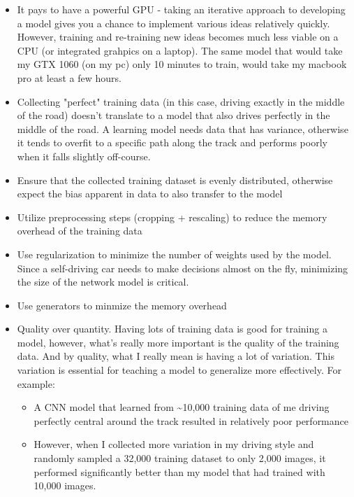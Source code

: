 \documentclass[11pt]{article}
\providecommand{\tightlist}{%
      \setlength{\itemsep}{0pt}\setlength{\parskip}{0pt}}
\begin{document}
\begin{itemize}
\tightlist
\item
  It pays to have a powerful GPU - taking an iterative approach to
  developing a model gives you a chance to implement various ideas
  relatively quickly. However, training and re-training new ideas
  becomes much less viable on a CPU (or integrated grahpics on a
  laptop). The same model that would take my GTX 1060 (on my pc) only 10
  minutes to train, would take my macbook pro at least a few hours.
\item
  Collecting "perfect" training data (in this case, driving exactly in
  the middle of the road) doesn't translate to a model that also drives
  perfectly in the middle of the road. A learning model needs data that
  has variance, otherwise it tends to overfit to a specific path along
  the track and performs poorly when it falls slightly off-course.
\item
  Ensure that the collected training dataset is evenly distributed,
  otherwise expect the bias apparent in data to also transfer to the
  model
\item
  Utilize preprocessing steps (cropping + rescaling) to reduce the
  memory overhead of the training data
\item
  Use regularization to minimize the number of weights used by the
  model. Since a self-driving car needs to make decisions almost on the
  fly, minimizing the size of the network model is critical.
\item
  Use generators to minmize the memory overhead
\item
  Quality over quantity. Having lots of training data is good for
  training a model, however, what's really more important is the quality
  of the training data. And by quality, what I really mean is having a
  lot of variation. This variation is essential for teaching a model to
  generalize more effectively. For example:

  \begin{itemize}
  \tightlist
  \item
    A CNN model that learned from \textasciitilde{}10,000 training data
    of me driving perfectly central around the track resulted in
    relatively poor performance
  \item
    However, when I collected more variation in my driving style and
    randomly sampled a 32,000 training dataset to only 2,000 images, it
    performed significantly better than my model that had trained with
    10,000 images.
  \end{itemize}
\end{itemize}
\end{document}
